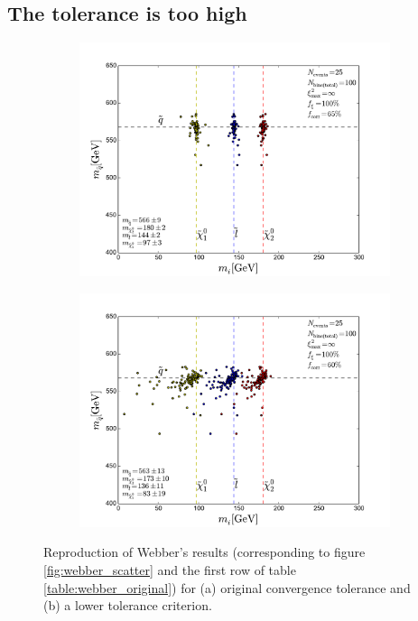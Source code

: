 \documentclass[twoside,english]{uiofysmaster}
\begin{document}
\subsection{The tolerance is too high}



\begin{figure}[hbt]
	\centering
	\begin{subfigure}[b]{0.6\textwidth}
		\includegraphics[width=\textwidth]{figures/webber_rec_table/webber_rec_table-samesettings_0psmear-nocut.pdf} 
		\caption{ }
		\label{fig:webber_rec_scatter_tolerance-comparison_a}
	\end{subfigure}

	\begin{subfigure}[b]{0.6\textwidth}
		\includegraphics[width=\textwidth]{figures/webber_rec_table/webber_HW-rec_nocut.pdf}
		\caption{ } 
		\label{fig:webber_rec_scatter_tolerance-comparison_b}
	\end{subfigure}
	\caption{Reproduction of Webber's results (corresponding to figure \ref{fig:webber_scatter} and the first row of table \ref{table:webber_original}) for (a) original convergence tolerance and (b) a lower tolerance criterion.}
	\label{fig:webber_rec_scatter_tolerance-comparison}
\end{figure}
\end{document}
